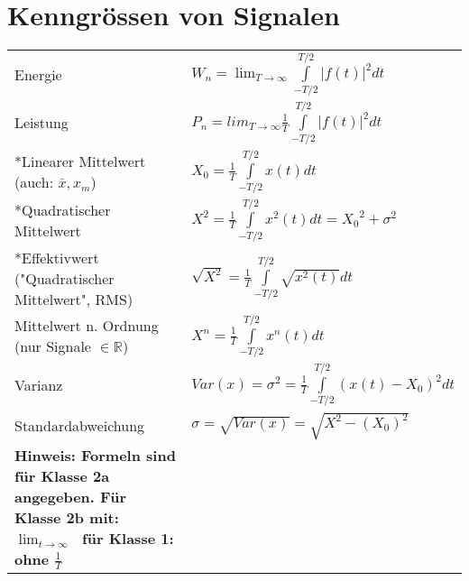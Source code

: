 \section{Kenngrössen von Signalen}
\begin{tabular}{p{6cm}p{12cm}}
  Energie                                                            &
  $W_n = \lim_{T \to \infty}  \int \limits _{-T/2} ^{T/2} |f(t)|^2 dt$            \\
  \rowcolor{TabularBackgroundColor}
  Leistung                                                           &
  $P_n = lim_{T \to \infty} \frac{1}{T} \int \limits _{-T/2} ^{T/2} |f(t)|^2 dt$  \\
  *Linearer Mittelwert
  \newline \tiny(auch: $ \bar{x}, x_m$)                              &
  $X_0 = \frac{1}{T} \int \limits _{-T/2}^{T/2} x(t) dt $                         \\
  \rowcolor{TabularBackgroundColor}
  *Quadratischer Mittelwert                                          &
  $X^2 = \frac{1}{T} \int \limits _{-T/2}^{T/2} x^2(t) dt = {X_0}^2 + \sigma^2 $                        \\
  *Effektivwert \newline \tiny{("Quadratischer Mittelwert", RMS)}    &
  $\sqrt{X^2} = \frac{1}{T} \int \limits _{-T/2}^{T/2} \sqrt{x^2(t)} dt $                \\
  \rowcolor{TabularBackgroundColor}
  Mittelwert n. Ordnung \newline \tiny(nur Signale $\in \mathbb{R}$) &
  $X^n = \frac{1}{T} \int \limits _{-T/2} ^{T/2} x^n(t)dt$                        \\
  Varianz                                                            &
  $Var(x) = \sigma^2 = \frac{1}{T} \int \limits _{-T/2} ^{T/2} (x(t) - X_0)^2 dt$ \\
  \rowcolor{TabularBackgroundColor}
  Standardabweichung                                                 &
  $\sigma = \sqrt{Var(x)} = \sqrt{X^2 - (X_0)^2}$                                 \\
  \textbf{\tiny *Hinweis: Formeln sind für Klasse 2a angegeben. \newline
  Für Klasse 2b mit: $\lim_{t \to \infty}\;$ für Klasse 1: ohne $\frac{1}{T}$ }
\end{tabular}

